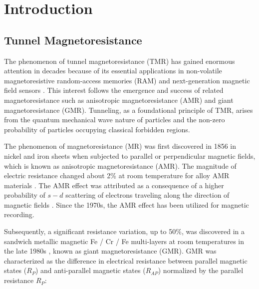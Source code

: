 \documentclass[molecules,review,submit,pdftex,moreauthors]{Definitions/mdpi}
\begin{document}

\tableofcontents

\vspace{12pt}
\section{Introduction}

\subsection{Tunnel Magnetoresistance} 


The phenomenon of tunnel magnetoresistance (TMR) has gained enormous attention in decades because of its essential applications in non-volatile magnetoresistive random-access memories (RAM) and next-generation magnetic field sensors \cite{Wolf1488,Yuasa2004NM,Djayaprawira2005APL, Newman2015JAP,Bowen2001APL,Heinrich1994Book,Gallagher2006IBM,seifu2018nanowires}.  This interest follows the emergence and success of related magnetoresistance such as anisotropic magnetoresistance (AMR) and giant magnetoresistance (GMR).  Tunneling, as a foundational principle of TMR, arises from the quantum mechanical wave nature of particles and the non-zero probability of particles occupying classical forbidden regions. 


The phenomenon of magnetoresistance (MR) was first discovered in 1856 \cite{Thomson1856PRSL} in nickel and iron sheets when subjected to parallel or perpendicular magnetic fields, which is known as anisotropic magnetoresistance (AMR).  The magnitude of electric resistance changed about \unit{2}{\%} at room temperature for alloy AMR materials \cite{Nickel1995TechnicalReport}.  The AMR effect was attributed as a consequence of  a higher probability of $s-d$ scattering of electrons traveling along the direction of magnetic fields \cite{McGuire1975IEEE}.  Since the 1970s, the AMR effect has been utilized for magnetic recording.  


Subsequently, a significant resistance variation, up to \unit{50}{\%}, was discovered in a sandwich metallic magnetic Fe / Cr / Fe multi-layers at room temperatures in the late 1980s \cite{Baibich1988PRL,Binasch1989PRB}, known as giant magnetoresistance (GMR).  GMR was characterized as the difference in electrical resistance between parallel magnetic states ($R_{P}$) and anti-parallel magnetic states ($R_{AP}$) normalized by the parallel resistance $R_P$: 
\end{document}
